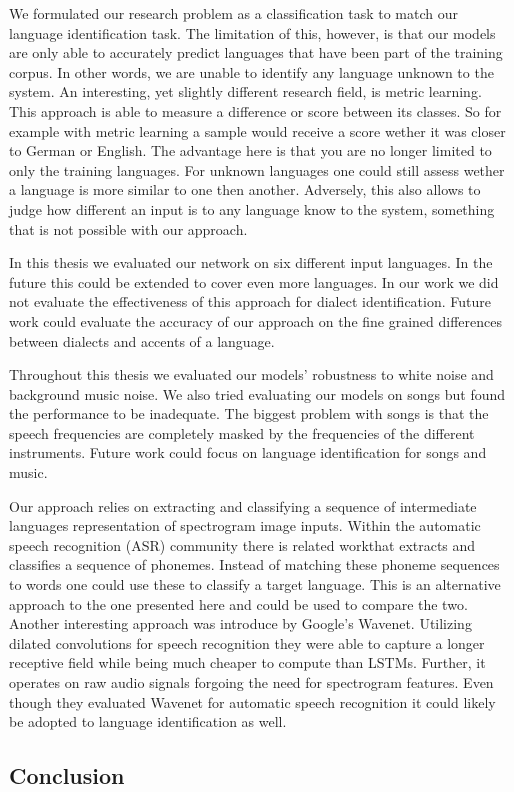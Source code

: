 We formulated our research problem as a classification task to match our language identification task. The limitation of this, however, is that our models are only able to accurately predict languages that have been part of the training corpus. In other words, we are unable to identify any language unknown to the system. An interesting, yet slightly different research field, is metric learning. This approach is able to measure a difference or score between its classes. So for example with metric learning a sample would receive a score wether it was closer to German or English. The advantage here is that you are no longer limited to only the training languages. For unknown languages one could still assess wether a language is more similar to one then another. Adversely, this also allows to judge how different an input is to any language know to the system, something that is not possible with our approach.

In this thesis we evaluated our network on six different input languages. In the future this could be extended to cover even more languages. In our work we did not evaluate the effectiveness of this approach for dialect identification. Future work could evaluate the accuracy of our approach on the fine grained differences between dialects and accents of a language.

Throughout this thesis we evaluated our models' robustness to white noise and background music noise. We also tried evaluating our models on songs but found the performance to be inadequate. The biggest problem with songs is that the speech frequencies are completely masked by the frequencies of the different instruments. Future work could focus on language identification for songs and music.

Our approach relies on extracting and classifying a sequence of intermediate languages representation of spectrogram image inputs. Within the automatic speech recognition (ASR) community there is related work\cite{song2015end}that extracts and classifies a sequence of phonemes. Instead of matching these phoneme sequences to words one could use these to classify a target language. This is an alternative approach to the one presented here and could be used to compare the two. Another interesting approach was introduce by Google's Wavenet\cite{van2016wavenet}. Utilizing dilated convolutions for speech recognition they were able to capture a longer receptive field while being much cheaper to compute than LSTMs. Further, it operates on raw audio signals forgoing the need for spectrogram features.  Even though they evaluated Wavenet for automatic speech recognition it could likely be adopted to language identification as well. 

\subsection{Conclusion}